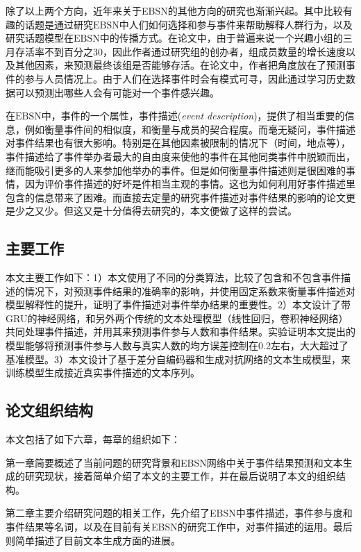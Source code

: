 除了以上两个方向，近年来关于EBSN的其他方向的研究也渐渐兴起。其中比较有趣的话题是通过研究$\mathrm{EBSN}$中人们如何选择和参与事件来帮助解释人群行为\cite{EBSN_understanding}，以及研究话题模型在$\mathrm{EBSN}$中的传播方式。在论文\cite{EBSN_can_i}中，由于普遍来说一个兴趣小组的三月存活率不到百分之30，因此作者通过研究组的创办者，组成员数量的增长速度以及其他因素，来预测最终该组是否能够存活。在论文\cite{EBSN_who_will}中，作者把角度放在了预测事件的参与人员情况上。由于人们在选择事件时会有模式可寻，因此通过学习历史数据可以预测出哪些人会有可能对一个事件感兴趣。

在$\mathrm{EBSN}$中，事件的一个属性，事件描述(\textit{event description})，提供了相当重要的信息，例如衡量事件间的相似度，和衡量与成员的契合程度。而毫无疑问，事件描述对事件结果也有很大影响。特别是在其他因素被限制的情况下（时间，地点等），事件描述给了事件举办者最大的自由度来使他的事件在其他同类事件中脱颖而出，继而能吸引更多的人来参加他举办的事件。但是如何衡量事件描述则是很困难的事情，因为评价事件描述的好坏是件相当主观的事情。这也为如何利用好事件描述里包含的信息带来了困难。而直接去定量的研究事件描述对事件结果的影响的论文更是少之又少。但这又是十分值得去研究的，本文便做了这样的尝试。

\subsection{主要工作}
本文主要工作如下：1）本文使用了不同的分类算法，比较了包含和不包含事件描述的情况下，对预测事件结果的准确率的影响，并使用固定系数来衡量事件描述对模型解释性的提升，证明了事件描述对事件举办结果的重要性。2）本文设计了带GRU的神经网络，和另外两个传统的文本处理模型（线性回归，卷积神经网络）共同处理事件描述，并用其来预测事件参与人数和事件结果。实验证明本文提出的模型能够将预测事件参与人数与真实人数的均方误差控制在0.2左右，大大超过了基准模型。3）本文设计了基于差分自编码器和生成对抗网络的文本生成模型，来训练模型生成接近真实事件描述的文本序列。
\subsection{论文组织结构}
本文包括了如下六章，每章的组织如下：

第一章简要概述了当前问题的研究背景和EBSN网络中关于事件结果预测和文本生成的研究现状，接着简单介绍了本文的主要工作，并在最后说明了本文的组织结构。

第二章主要介绍研究问题的相关工作，先介绍了EBSN中事件描述，事件参与度和事件结果等名词，以及在目前有关EBSN的研究工作中，对事件描述的运用。最后则简单描述了目前文本生成方面的进展。 

